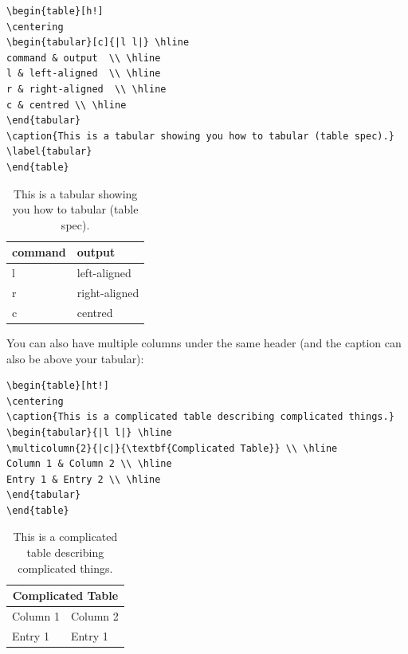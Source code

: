 \documentclass[a4paper, 12pt]{article} %
\begin{document}
\begin{verbatim}
\begin{table}[h!]
\centering
\begin{tabular}[c]{|l l|} \hline
command & output  \\ \hline
l & left-aligned  \\ \hline
r & right-aligned  \\ \hline
c & centred \\ \hline
\end{tabular}
\caption{This is a tabular showing you how to tabular (table spec).}
\label{tabular}
\end{table}
\end{verbatim}
\begin{table}[h!]
	\centering
\begin{tabular}[c]{|l l|} \hline
	command & output  \\ \hline
	l & left-aligned  \\ \hline
	r & right-aligned  \\ \hline
	c & centred \\ \hline
\end{tabular}
\caption{This is a tabular showing you how to tabular (table spec).}
\label{tabular}
\end{table}
\noindent You can also have multiple columns under the same header (and the caption can also be above your tabular):


\begin{verbatim}
\begin{table}[ht!]
\centering
\caption{This is a complicated table describing complicated things.}
\begin{tabular}{|l l|} \hline
\multicolumn{2}{|c|}{\textbf{Complicated Table}} \\ \hline
Column 1 & Column 2 \\ \hline
Entry 1 & Entry 2 \\ \hline
\end{tabular}
\end{table}
\end{verbatim}

\begin{table}[ht!]
	\centering
	\caption{This is a complicated table describing complicated things.}
\begin{tabular}{|l l|} \hline
\multicolumn{2}{|c|}{\textbf{Complicated Table}} \\ \hline
Column 1 & Column 2 \\ \hline
Entry 1 & Entry 1\\ \hline
\end{tabular}
\end{table}
\end{document}
